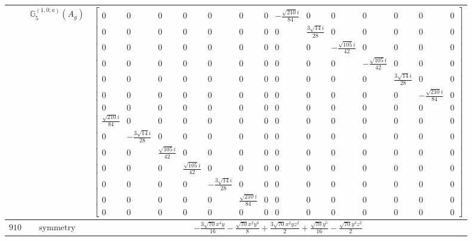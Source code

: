 \documentclass[fleqn,8pt,landscape]{jsarticle}
\begin{document}
\begin{longtable}{ccc}
$  $ & $ \mathbb{G}_{5}^{(1,0;a)}(A_{g}) $ & $ \begin{bmatrix} 0 & 0 & 0 & 0 & 0 & 0 & 0 & - \frac{\sqrt{210} i}{84} & 0 & 0 & 0 & 0 & 0 & 0 \\ 0 & 0 & 0 & 0 & 0 & 0 & 0 & 0 & \frac{3 \sqrt{14} i}{28} & 0 & 0 & 0 & 0 & 0 \\ 0 & 0 & 0 & 0 & 0 & 0 & 0 & 0 & 0 & - \frac{\sqrt{105} i}{42} & 0 & 0 & 0 & 0 \\ 0 & 0 & 0 & 0 & 0 & 0 & 0 & 0 & 0 & 0 & - \frac{\sqrt{105} i}{42} & 0 & 0 & 0 \\ 0 & 0 & 0 & 0 & 0 & 0 & 0 & 0 & 0 & 0 & 0 & \frac{3 \sqrt{14} i}{28} & 0 & 0 \\ 0 & 0 & 0 & 0 & 0 & 0 & 0 & 0 & 0 & 0 & 0 & 0 & - \frac{\sqrt{210} i}{84} & 0 \\ 0 & 0 & 0 & 0 & 0 & 0 & 0 & 0 & 0 & 0 & 0 & 0 & 0 & 0 \\ \frac{\sqrt{210} i}{84} & 0 & 0 & 0 & 0 & 0 & 0 & 0 & 0 & 0 & 0 & 0 & 0 & 0 \\ 0 & - \frac{3 \sqrt{14} i}{28} & 0 & 0 & 0 & 0 & 0 & 0 & 0 & 0 & 0 & 0 & 0 & 0 \\ 0 & 0 & \frac{\sqrt{105} i}{42} & 0 & 0 & 0 & 0 & 0 & 0 & 0 & 0 & 0 & 0 & 0 \\ 0 & 0 & 0 & \frac{\sqrt{105} i}{42} & 0 & 0 & 0 & 0 & 0 & 0 & 0 & 0 & 0 & 0 \\ 0 & 0 & 0 & 0 & - \frac{3 \sqrt{14} i}{28} & 0 & 0 & 0 & 0 & 0 & 0 & 0 & 0 & 0 \\ 0 & 0 & 0 & 0 & 0 & \frac{\sqrt{210} i}{84} & 0 & 0 & 0 & 0 & 0 & 0 & 0 & 0 \\ 0 & 0 & 0 & 0 & 0 & 0 & 0 & 0 & 0 & 0 & 0 & 0 & 0 & 0 \end{bmatrix} $ \\ \hline
$ 910 $ & $ \text{symmetry} $ & $ - \frac{3 \sqrt{70} x^{4} y}{16} - \frac{\sqrt{70} x^{2} y^{3}}{8} + \frac{3 \sqrt{70} x^{2} y z^{2}}{2} + \frac{\sqrt{70} y^{5}}{16} - \frac{\sqrt{70} y^{3} z^{2}}{2} $ \\

\end{longtable}
\end{document}
